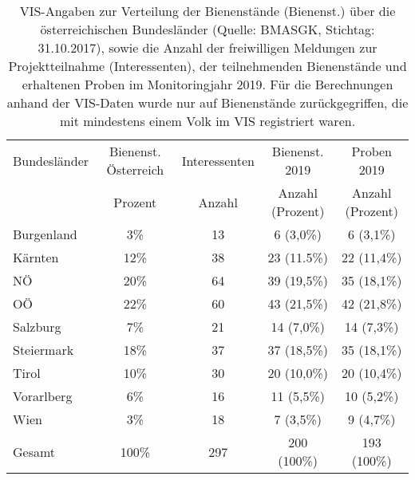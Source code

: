 \begin{table}[htp]
    \caption{VIS-Angaben zur Verteilung der Bienenstände (Bienenst.) über die österreichischen Bundesländer (Quelle: BMASGK, Stichtag: 31.10.2017), sowie die Anzahl der freiwilligen Meldungen zur Projektteilnahme (Interessenten), der teilnehmenden Bienenstände und erhaltenen Proben im Monitoringjahr 2019. Für die Berechnungen anhand der VIS-Daten wurde nur auf Bienenstände zurückgegriffen, die mit mindestens einem Volk im VIS registriert waren.}
    \centering
    \begin{tabular}{|l|c|c|c|c|}
    \hline
    Bundesländer    & Bienenst. Österreich &  Interessenten & Bienenst. 2019        & Proben 2019 \\ [0.5ex]
                    & Prozent                &  Anzahl       &   Anzahl (Prozent)    & Anzahl (Prozent)\\
    \hline
    Burgenland      &   3\%     &   13   & 6 (3,0\%)    & 6 (3,1\%)     \\
    Kärnten         &   12\%    &   38   & 23 (11.5\%)  & 22 (11,4\%)       \\
    NÖ              &   20\%    &   64   & 39 (19,5\%)  & 35 (18,1\%)       \\
    OÖ              &   22\%    &   60   & 43 (21,5\%)  & 42 (21,8\%)       \\
    Salzburg        &   7\%     &   21   & 14 (7,0\%)   & 14 (7,3\%)       \\
    Steiermark      &  18\%     &   37   & 37 (18,5\%)  & 35 (18,1\%)       \\
    Tirol           &   10\%    &   30   & 20 (10,0\%)  & 20 (10,4\%)       \\
    Vorarlberg      &   6\%     &   16   & 11 (5,5\%)   & 10 (5,2\%)       \\
    Wien            &   3\%     &   18   & 7 (3,5\%)    & 9 (4,7\%)       \\
    \hline
    Gesamt          &   100\%   &   297  & 200 (100\%)  & 193 (100\%)       \\
    \hline
    \end{tabular}
    \label{tab:b:probenanzahl}
\end{table}
